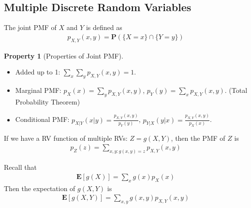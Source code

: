 \documentclass[device=normal, lang=en, fontsize=12pt]{elegantnote}
\numberwithin{equation}{section}
\theoremstyle{definition} %
\newtheorem{property}{Property}[section] %
\begin{document}
\subsection{Multiple Discrete Random Variables}
\begin{definition}
    The joint PMF of $X$ and $Y$ is defined as
    \begin{align}
        p_{X, Y}(x, y) = \mathbf{P}(\{X = x\} \cap \{Y = y\})
    \end{align}
\end{definition}
\begin{property}[Properties of Joint PMF] ~
    \begin{itemize}
        \item Added up to 1: $\sum_x \sum_y p_{X, Y}(x, y) = 1$.
        \item Marginal PMF: $p_{X}(x) = \sum_y p_{X, Y}(x, y)$, $p_{Y}(y) = \sum_x p_{X, Y}(x, y)$. (Total Probability Theorem)
        \item Conditional PMF: $p_{X|Y}(x|y) = \frac{p_{X, Y}(x, y)}{p_{Y}(y)}$, $p_{Y|X}(y|x) = \frac{p_{X, Y}(x, y)}{p_{X}(x)}$.
    \end{itemize}
\end{property}
If we have a RV function of multiple RVs: $Z = g(X, Y)$, then the PMF of $Z$ is
\begin{align}
    p_{Z}(z) = \sum_{x, y: g(x, y) = z} p_{X, Y}(x, y)
\end{align}
\begin{definition}
    Recall that 
    \begin{align*}
        \mathbf{E}[g(X)] = \sum_{x} g(x) p_{X}(x)
    \end{align*}
    Then the expectation of $g(X, Y)$ is
    \begin{align}
        \mathbf{E}[g(X, Y)] = \sum_{x, y} g(x, y) p_{X, Y}(x, y)
    \end{align}
\end{definition}
\end{document}
